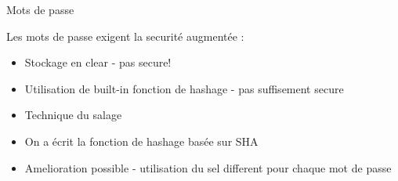 \begin{frame}{Mots de passe}

  Les mots de passe exigent la securité augmentée : 
  \begin{itemize}
  \item Stockage en clear - pas secure!
  \item Utilisation de built-in fonction de hashage - pas suffisement secure
  \item Technique du salage
  \item On a écrit la fonction de hashage basée sur SHA
  \item Amelioration possible - utilisation du sel different pour chaque mot de passe
  \end{itemize}
\end{frame}